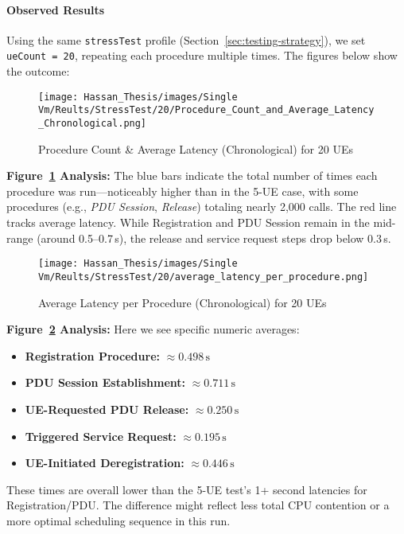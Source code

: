 \paragraph{Observed Results}

Using the same \texttt{stressTest} profile (Section~\ref{sec:testing-strategy}), we set \texttt{ueCount = 20}, repeating each procedure multiple times. The figures below show the outcome:

\begin{figure}[H]
    \centering
    \texttt{[image: Hassan\_Thesis/images/Single Vm/Reults/StressTest/20/Procedure\_Count\_and\_Average\_Latency\_Chronological.png]}
    \caption{Procedure Count \& Average Latency (Chronological) for 20 UEs}
    \label{fig:20ue-count-latency}
\end{figure}

\noindent
\textbf{Figure~\ref{fig:20ue-count-latency} Analysis:}  
The blue bars indicate the total number of times each procedure was run—noticeably higher than in the 5-UE case, with some procedures (e.g., \textit{PDU Session}, \textit{Release}) totaling nearly 2,000 calls. The red line tracks average latency. While Registration and PDU Session remain in the mid-range (around 0.5--0.7\,s), the release and service request steps drop below 0.3\,s.

\vspace{0.75em}
\begin{figure}[H]
    \centering
    \texttt{[image: Hassan\_Thesis/images/Single Vm/Reults/StressTest/20/average\_latency\_per\_procedure.png]}
    \caption{Average Latency per Procedure (Chronological) for 20 UEs}
    \label{fig:20ue-avg-latency}
\end{figure}

\noindent
\textbf{Figure~\ref{fig:20ue-avg-latency} Analysis:}  
Here we see specific numeric averages:
\begin{itemize}
    \item \textbf{Registration Procedure:} $\approx 0.498\,\text{s}$
    \item \textbf{PDU Session Establishment:} $\approx 0.711\,\text{s}$
    \item \textbf{UE-Requested PDU Release:} $\approx 0.250\,\text{s}$
    \item \textbf{Triggered Service Request:} $\approx 0.195\,\text{s}$
    \item \textbf{UE-Initiated Deregistration:} $\approx 0.446\,\text{s}$
\end{itemize}
These times are overall lower than the 5-UE test’s 1+ second latencies for Registration/PDU. The difference might reflect less total CPU contention or a more optimal scheduling sequence in this run.

